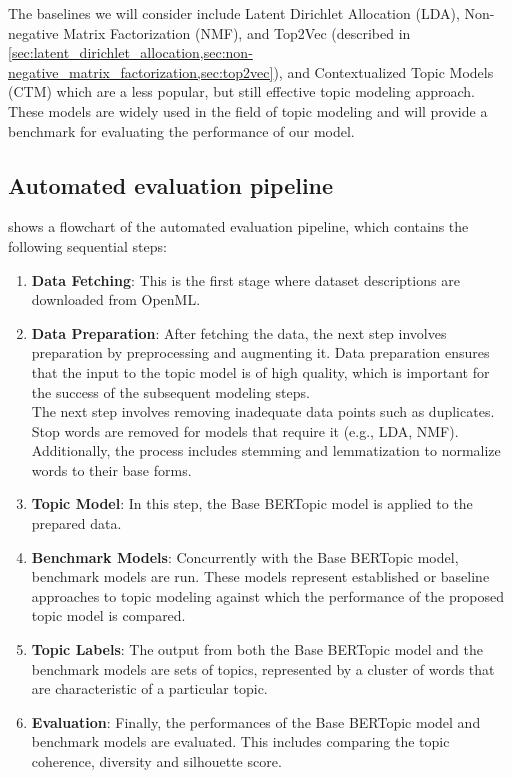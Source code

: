 The baselines we will consider include Latent Dirichlet Allocation (LDA), Non-negative Matrix Factorization (NMF), and Top2Vec (described in \cref{sec:latent_dirichlet_allocation,sec:non-negative_matrix_factorization,sec:top2vec}), and Contextualized Topic Models (CTM) \cite{bianchi_pre-training_2021, bianchi_cross-lingual_2021} which are a less popular, but still effective topic modeling approach. These models are widely used in the field of topic modeling and will provide a benchmark for evaluating the performance of our model.

\subsection{Automated evaluation pipeline}

 shows a flowchart of the automated evaluation pipeline, which contains the following sequential steps:

\begin{enumerate}

    \item \textbf{Data Fetching}: This is the first stage where dataset descriptions are downloaded from OpenML.

    \item \textbf{Data Preparation}: After fetching the data, the next step involves preparation by preprocessing and augmenting it. Data preparation ensures that the input to the topic model is of high quality, which is important for the success of the subsequent modeling steps. \\ The next step involves removing inadequate data points such as duplicates. Stop words are removed for models that require it (e.g., LDA, NMF). Additionally, the process includes stemming and lemmatization to normalize words to their base forms.

    \item \textbf{Topic Model}: In this step, the Base BERTopic model is applied to the prepared data.

    \item \textbf{Benchmark Models}: Concurrently with the Base BERTopic model, benchmark models are run. These models represent established or baseline approaches \cite{grootendorst_bertopic_2022, blei_latent_2001, shahnaz_document_2006, kasiviswanathan_emerging_2011, yan_learning_2013, angelov_top2vec_2020, bianchi_pre-training_2021, bianchi_cross-lingual_2021} to topic modeling against which the performance of the proposed topic model is compared.

    \item \textbf{Topic Labels}: The output from both the Base BERTopic model and the benchmark models are sets of topics, represented by a cluster of words that are characteristic of a particular topic.

    \item \textbf{Evaluation}: Finally, the performances of the Base BERTopic model and benchmark models are evaluated. This includes comparing the topic coherence, diversity and silhouette score.

\end{enumerate}

